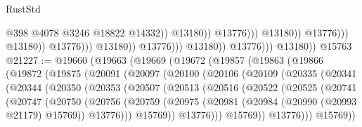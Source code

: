 \begin{lexlean}{RustStd}
\begin{coremodule}
                                                              @398
                                                              @4078
                                                              @3246
                                                              @18822
                                                              @14332))
                                                          @13180))
                                                      @13776)))
                                                @13180))
                                            @13776)))
                                      @13180))
                                  @13776)))
                            @13180))
                        @13776)))
                  @13180))
              @13776)))
        @13180))
    @15763
@21227 := @19660
    (@19663
      (@19669
        (@19672
          (@19857
            (@19863
              (@19866
                (@19872
                  (@19875
                    (@20091
                      (@20097
                        (@20100
                          (@20106
                            (@20109
                              (@20335
                                (@20341
                                  (@20344
                                    (@20350
                                      (@20353
                                        (@20507
                                          (@20513
                                            (@20516
                                              (@20522
                                                (@20525
                                                  (@20741
                                                    (@20747
                                                      (@20750
                                                        (@20756
                                                          (@20759
                                                            (@20975
                                                              (@20981
                                                                (@20984
                                                                  (@20990 (@20993 @21179) @15769))
                                                                @13776)))
                                                          @15769))
                                                      @13776)))
                                                @15769))
                                            @13776)))
                                      @15769))

\end{coremodule}
\end{lexlean}
